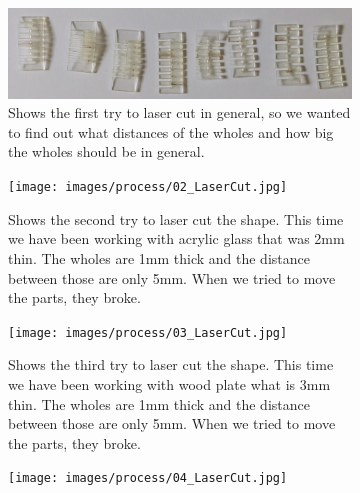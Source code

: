 \documentclass[00_doc.tex]{subfiles}
\begin{document}
    \begin{figure}[H]
        \centering
        \begin{subfigure}{.45\textwidth}
        \centering
        \includegraphics[width=0.8\linewidth]{images/process/01_LaserCut.jpg}
        \caption{Shows the first try to laser cut in general, so we wanted to
                find out what distances of the wholes and how big the wholes 
                should be in general.}
        \label{fig:01_LaserCut}
        \vspace{6mm}
        \end{subfigure}
        \medskip
        \hspace{1mm}
        \begin{subfigure}{.45\textwidth}
            \centering
            \texttt{[image: images/process/02\_LaserCut.jpg]}
            \caption{Shows the second try to laser cut the shape. This time we have been
                    working with acrylic glass that was 2mm thin. The wholes are 1mm thick 
                    and the distance between those are only 5mm. When we tried to move
                    the parts, they broke.}
            \label{fig:02_LaserCut}
            \vspace{6mm}
        \end{subfigure}
        \hspace{1mm}
        \begin{subfigure}{.45\textwidth}
            \centering
            \texttt{[image: images/process/03\_LaserCut.jpg]}
            \caption{Shows the third try to laser cut the shape. This time we have been
                    working with wood plate what is 3mm thin. The wholes are 1mm thick 
                    and the distance between those are only 5mm. When we tried to move
                    the parts, they broke.}
            \label{fig:03_LaserCut}
            \vspace{6mm}
        \end{subfigure}
        \hspace{1mm}
        \begin{subfigure}{.45\textwidth}
            \centering
            \texttt{[image: images/process/04\_LaserCut.jpg]}

\end{subfigure}
\end{figure}
\end{document}
